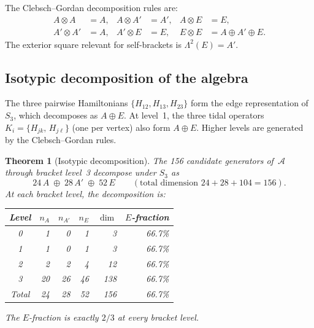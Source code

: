 \documentclass[11pt,a4paper]{article}
\newtheorem{theorem}{Theorem}
\theoremstyle{remark}
\newcommand{\pb}[2]{\{#1,\,#2\}}
\newcommand{\cA}{\mathcal{A}}
\newcommand{\SG}{S_3}
\begin{document}
The Clebsch--Gordan decomposition rules are:
\begin{align*}
  A \otimes A &= A, &
  A \otimes A' &= A', &
  A \otimes E &= E, \\
  A' \otimes A' &= A, &
  A' \otimes E &= E, &
  E \otimes E &= A \oplus A' \oplus E.
\end{align*}
The exterior square relevant for self-brackets is
$\Lambda^2(E) = A'$.

\subsection{Isotypic decomposition of the algebra}

The three pairwise Hamiltonians $\{H_{12}, H_{13},
H_{23}\}$ form the edge representation of $\SG$, which
decomposes as $A \oplus E$.  At level~1, the three tidal
operators $K_i = \pb{H_{jk}}{H_{j\ell}}$ (one per
vertex) also form $A \oplus E$.  Higher levels are
generated by the Clebsch--Gordan rules.

\begin{theorem}[Isotypic decomposition]
\label{thm:isotypic}
The 156 candidate generators of~$\cA$ through bracket
level~3 decompose under $\SG$ as
\[
  24\,A \;\oplus\; 28\,A' \;\oplus\; 52\,E
  \qquad (\text{total dimension } 24 + 28 + 104 = 156).
\]
At each bracket level, the decomposition is:
\begin{center}
\begin{tabular}{@{}crrrrr@{}}
\toprule
Level & $n_A$ & $n_{A'}$ & $n_E$ & $\dim$
  & $E$-fraction \\
\midrule
0 & 1 & 0 & 1 & 3 & 66.7\% \\
1 & 1 & 0 & 1 & 3 & 66.7\% \\
2 & 2 & 2 & 4 & 12 & 66.7\% \\
3 & 20 & 26 & 46 & 138 & 66.7\% \\
\midrule
Total & 24 & 28 & 52 & 156 & 66.7\% \\
\bottomrule
\end{tabular}
\end{center}
The $E$-fraction is exactly $2/3$ at every bracket level.
\end{theorem}
\end{document}
